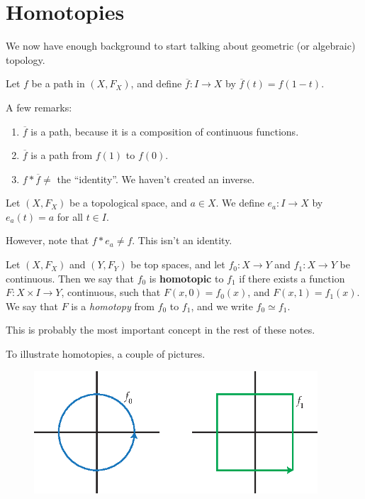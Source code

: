 

\section{Homotopies} We now have enough background to start talking about geometric (or algebraic) topology.
\begin{definition}
	Let $f$ be a path in $(X,F_X)$, and define $\overline{f} : I \to X$ by $\overline{f} (t) = f(1-t)$. 
\end{definition}

A few remarks: 
\begin{enumerate}
	\item $\overline{f}$ is a path, because it is a composition of continuous functions. 
	\item $\overline{f}$ is a path from $f(1)$ to $f(0)$. 
	\item $f \ast \overline{f} \neq $ the ``identity''. We haven't created an inverse. 
\end{enumerate}
\begin{definition}
	Let $(X,F_X)$ be a topological space, and $a\in X$. We define $e_a: I\to X$ by $e_a (t) = a$ for all $t\in I$. 
\end{definition}

However, note that $f\ast e_a \neq f$. This isn't an identity.
\begin{definition}
	Let $(X,F_X)$ and $(Y,F_Y)$ be top spaces, and let $f_0: X \to Y$ and $f_1:X\to Y$ be continuous. Then we say that $f_0$ is \textbf{homotopic} to $f_1$ if there exists a function $F:X\times I \to Y$, continuous, such that $F(x,0) = f_0 (x)$, and $F(x,1) = f_1(x)$. We say that $F$ is a \textit{homotopy} from $f_0$ to $f_1$, and we write $f_0 \simeq f_1$. 
\end{definition}

This is probably the most important concept in the rest of these notes.

To illustrate homotopies, a couple of pictures.
\begin{figure}[ht!]
    \centering
    \includegraphics[width=300pt]{images/homotopy/circle_and_square}
\end{figure}

